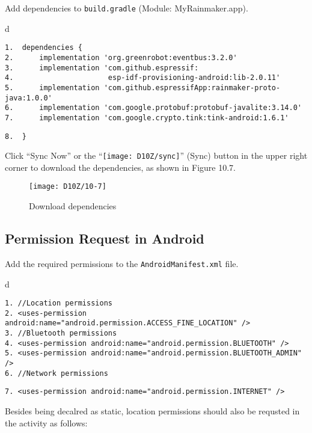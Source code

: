 \documentclass[a4paper,12pt]{book}
\begin{document}
Add dependencies to \verb|build.gradle| (Module: MyRainmaker.app).

\begin{codebloc}
\begin{tabular}{d}
\vspace{2pt}
\begin{verbatim}
1.  dependencies {
2.      implementation 'org.greenrobot:eventbus:3.2.0'
3.      implementation 'com.github.espressif:
4.                      esp-idf-provisioning-android:lib-2.0.11'
5.      implementation 'com.github.espressifApp:rainmaker-proto-java:1.0.0'
6.      implementation 'com.google.protobuf:protobuf-javalite:3.14.0'
7.      implementation 'com.google.crypto.tink:tink-android:1.6.1'
\end{verbatim}
\verb|8.  }|
\end{tabular}
\end{codebloc}

Click “Sync Now” or the “\texttt{[image: D10Z/sync]}” (Sync) button in the upper right corner to download the dependencies, as shown in Figure 10.7.

\begin{figure}[ht]
    \centering
    \texttt{[image: D10Z/10-7]}
    \caption{Download dependencies}
\end{figure}

\subsection{Permission Request in Android}
Add the required permissions to the \verb|AndroidManifest.xml| file.

\begin{codebloc}
\begin{tabular}{d}
\vspace{2pt}
\begin{verbatim}
1. //Location permissions
2. <uses-permission android:name="android.permission.ACCESS_FINE_LOCATION" />
3. //Bluetooth permissions
4. <uses-permission android:name="android.permission.BLUETOOTH" />
5. <uses-permission android:name="android.permission.BLUETOOTH_ADMIN" />
6. //Network permissions
\end{verbatim}
\verb|7. <uses-permission android:name="android.permission.INTERNET" />|
\end{tabular}
\end{codebloc}

Besides being decalred as static, location permissions should also be requsted in the activity as follows:
\end{document}
